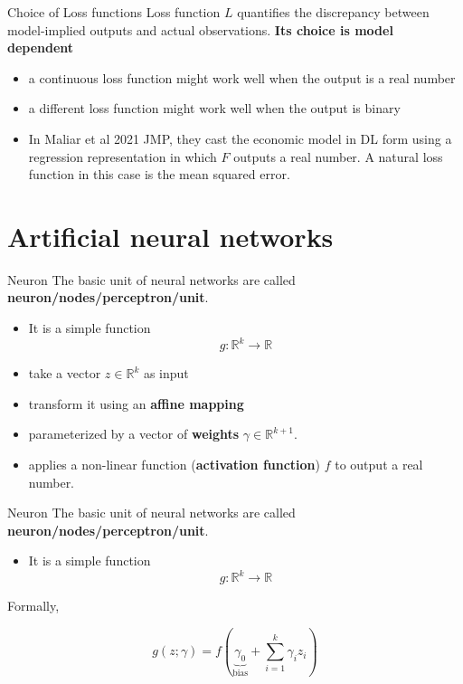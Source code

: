 \documentclass[aspectratio=169]{beamer} %
\begin{document}
\begin{frame}{Choice of Loss functions}
Loss function $L$ quantifies the discrepancy between model-implied outputs and actual observations. \textbf{Its choice is model dependent}
\begin{itemize}
    \item a continuous loss function might work well when the output is a real number
    \item a different loss function might work well when the output is binary
    \item In Maliar et al 2021 JMP, they cast the economic model in DL form using a regression representation in which $F$ outputs a real number. A natural loss function in this case is the mean squared error.
\end{itemize}
    
\end{frame}

\section{Artificial neural networks}

\begin{frame}{Neuron}
The basic unit of neural networks are called \textbf{neuron/nodes/perceptron/unit}. 
\begin{itemize}
    \item It is a simple function
    $$
    g: \mathbb{R}^k \to \mathbb{R}
    $$
    \item take a vector $z\in\mathbb{R}^k$ as input
    \item transform it using an \textbf{affine mapping}
    \item parameterized by a vector of \textbf{weights} $\gamma\in\mathbb{R}^{k+1}$.
    \item applies a non-linear function (\textbf{activation function}) $f$ to output a real number.
\end{itemize}
    
\end{frame}


\begin{frame}{Neuron}
    The basic unit of neural networks are called \textbf{neuron/nodes/perceptron/unit}. 
\begin{itemize}
    \item It is a simple function
    $$
    g: \mathbb{R}^k \to \mathbb{R}
    $$
\end{itemize}
Formally,

$$
g(z;\gamma) = f\left(\underbrace{\gamma_0}_{\text{bias}} + \sum_{i=1}^k \gamma_i z_i\right)
$$
\end{frame}
\end{document}
